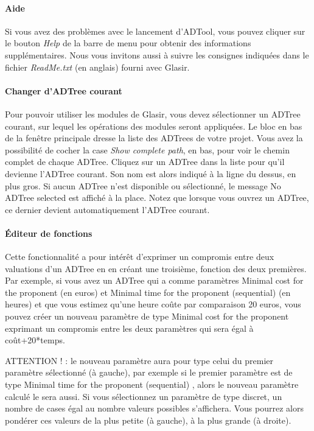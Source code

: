 \paragraph{Aide} Si vous avez des problèmes avec le lancement d'ADTool, vous pouvez cliquer sur le bouton \emph{Help} de la barre de menu pour obtenir des informations supplémentaires. Nous vous invitons aussi à suivre les consignes indiquées dans le fichier \emph{ReadMe.txt} (en anglais) fourni avec Glasir.

\paragraph{Changer d'ADTree courant} Pour pouvoir utiliser les modules de Glasir, vous devez sélectionner un ADTree courant, sur lequel les opérations des modules seront appliquées. Le bloc en bas de la fenêtre principale dresse la liste des ADTrees de votre projet.  Vous avez la possibilité de cocher la case \emph{Show complete path}, en bas, pour voir le chemin complet de chaque ADTree. Cliquez sur un ADTree dans la liste pour qu'il devienne l'ADTree courant. Son nom est alors indiqué à la ligne du dessus, en plus gros. Si aucun ADTree n'est disponible ou sélectionné, le message \og No ADTree selected \fg{} est affiché à la place. Notez que lorsque vous ouvrez un ADTree, ce dernier devient automatiquement l'ADTree courant.

\paragraph{Éditeur de fonctions} Cette fonctionnalité a pour intérêt d'exprimer un compromis entre deux valuations d'un ADTree en en créant une troisième, fonction des deux premières. Par exemple, si vous avez un ADTree qui a comme paramètres \og Minimal cost for the proponent \fg (en euros) et \og Minimal time for the proponent (sequential) \fg (en heures) et que vous estimez qu'une heure \og coûte \fg par comparaison 20 euros, vous pouvez créer un nouveau paramètre de type \og Minimal cost for the proponent \fg exprimant un compromis entre les deux paramètres qui sera égal à coût+20*temps.

ATTENTION  ! : le nouveau paramètre aura pour type celui du premier paramètre sélectionné (à gauche), par exemple si le premier paramètre est de type \og Minimal time for the proponent (sequential) \fg , alors le nouveau paramètre calculé le sera aussi. Si vous sélectionnez un paramètre de type discret, un nombre de cases égal au nombre valeurs possibles s'affichera. Vous pourrez alors pondérer ces valeurs de la plus petite (à gauche), à la plus grande (à droite).


